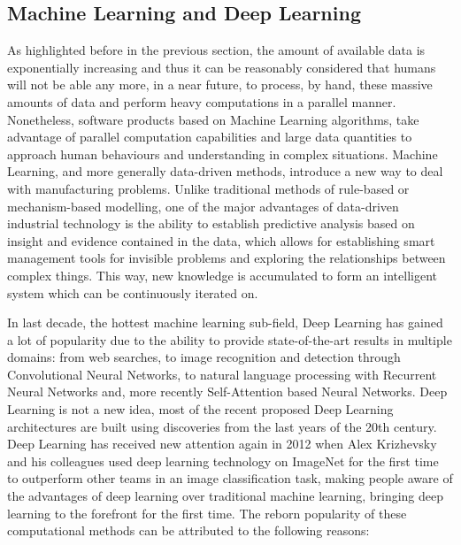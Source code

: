 \subsection{Machine Learning and Deep Learning}

As highlighted before in the previous section, the amount of available data is exponentially increasing and thus it can be reasonably considered that humans will not be able any more, in a near future, to process, by hand, these massive amounts of data and perform heavy computations in a parallel manner. Nonetheless, software products based on Machine Learning algorithms, take advantage of parallel computation capabilities and large data quantities to approach human behaviours and understanding in complex situations. Machine Learning, and more generally data-driven methods, introduce a new way to deal with manufacturing problems. Unlike traditional methods of rule-based or mechanism-based modelling, one of the major advantages of data-driven industrial technology is the ability to establish predictive analysis based on insight and evidence contained in the data, which allows for establishing smart management tools for invisible problems and exploring the relationships between complex things. This way, new knowledge is accumulated to form an intelligent system which can be continuously iterated on.

In last decade, the hottest machine learning sub-field, Deep Learning has gained a lot of popularity due to the ability to provide state-of-the-art results in multiple domains: from web searches, to image recognition and detection through Convolutional Neural Networks, to natural language processing with Recurrent Neural Networks and, more recently Self-Attention based Neural Networks. Deep Learning is not a new idea, most of the recent proposed Deep Learning architectures are built using discoveries from the last years of the 20th century. Deep Learning has received new attention again in 2012 when Alex Krizhevsky and his colleagues used deep learning technology \citep{krizhevsky2012imagenet} on ImageNet for the first time to outperform other teams in an image classification task, making people aware of the advantages of deep learning over traditional machine learning, bringing deep learning to the forefront for the first time. The reborn popularity of these computational methods can be attributed to the following reasons:


